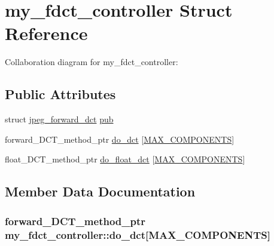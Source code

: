 \hypertarget{structmy__fdct__controller}{}\section{my\+\_\+fdct\+\_\+controller Struct Reference}
\label{structmy__fdct__controller}


Collaboration diagram for my\+\_\+fdct\+\_\+controller\+:
\subsection*{Public Attributes}
\begin{DoxyCompactItemize}
\item 
struct \hyperlink{structjpeg__forward__dct}{jpeg\+\_\+forward\+\_\+dct} \hyperlink{structmy__fdct__controller_a233a1343c6fc838dcad3d3dce3a658a0}{pub}
\item 
forward\+\_\+\+D\+C\+T\+\_\+method\+\_\+ptr \hyperlink{structmy__fdct__controller_a4708c82c14bc7a348520824d38f66f06}{do\+\_\+dct} \mbox{[}\hyperlink{jmorecfg_8h_a6d8c910a1fdb6d4762a05f7250e64322}{M\+A\+X\+\_\+\+C\+O\+M\+P\+O\+N\+E\+N\+T\+S}\mbox{]}
\item 
float\+\_\+\+D\+C\+T\+\_\+method\+\_\+ptr \hyperlink{structmy__fdct__controller_acaf7fa6e7d2647b35436654eb02d9bb3}{do\+\_\+float\+\_\+dct} \mbox{[}\hyperlink{jmorecfg_8h_a6d8c910a1fdb6d4762a05f7250e64322}{M\+A\+X\+\_\+\+C\+O\+M\+P\+O\+N\+E\+N\+T\+S}\mbox{]}
\end{DoxyCompactItemize}


\subsection{Member Data Documentation}
\hypertarget{structmy__fdct__controller_a4708c82c14bc7a348520824d38f66f06}{}
\subsubsection[{do\+\_\+dct}]{\setlength{\rightskip}{0pt plus 5cm}forward\+\_\+\+D\+C\+T\+\_\+method\+\_\+ptr my\+\_\+fdct\+\_\+controller\+::do\+\_\+dct\mbox{[}{\bf M\+A\+X\+\_\+\+C\+O\+M\+P\+O\+N\+E\+N\+T\+S}\mbox{]}}\label{structmy__fdct__controller_a4708c82c14bc7a348520824d38f66f06}
\hypertarget{structmy__fdct__controller_acaf7fa6e7d2647b35436654eb02d9bb3}{}
